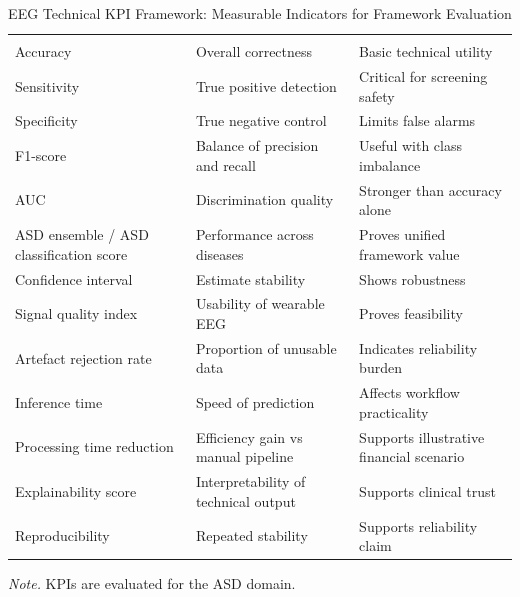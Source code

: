 {\tablestripes\tablefontsize
\begin{xltabular}{\textwidth}{@{} l L L @{}}
\caption[EEG Technical KPI Framework: Measurable Indicators for]{EEG Technical KPI Framework: Measurable Indicators for Framework Evaluation}\label{tab:eeg_kpi} \\
\toprule
{} &  &  \\
\midrule
\endfirsthead
\toprule
{} &  &  \\
\midrule
\endhead
\bottomrule
\endlastfoot
Accuracy & Overall correctness & Basic technical utility \\
Sensitivity & True positive detection & Critical for screening safety \\
Specificity & True negative control & Limits false alarms \\
F1-score & Balance of precision and recall & Useful with class imbalance \\
AUC & Discrimination quality & Stronger than accuracy alone \\
ASD ensemble / ASD classification score & Performance across diseases & Proves unified framework value \\
Confidence interval & Estimate stability & Shows robustness \\
Signal quality index & Usability of wearable EEG & Proves feasibility \\
Artefact rejection rate & Proportion of unusable data & Indicates reliability burden \\
Inference time & Speed of prediction & Affects workflow practicality \\
Processing time reduction & Efficiency gain vs manual pipeline & Supports illustrative financial scenario \\
Explainability score & Interpretability of technical output & Supports clinical trust \\
Reproducibility & Repeated stability & Supports reliability claim \\
\end{xltabular}}
\vspace{2pt}
\noindent\textit{Note.} KPIs are evaluated for the ASD domain.
\fi %


